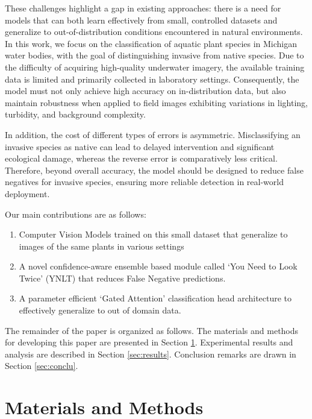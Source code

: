 \documentclass[final,3p,times,twocolumn]{elsarticle}
\begin{document}
These challenges highlight a gap in existing approaches: there is a need for models that can both learn effectively from small, controlled datasets and generalize to out-of-distribution conditions encountered in natural environments. In this work, we focus on the classification of aquatic plant species in Michigan water bodies, with the goal of distinguishing invasive from native species. Due to the difficulty of acquiring high-quality underwater imagery, the available training data is limited and primarily collected in laboratory settings. Consequently, the model must not only achieve high accuracy on in-distribution data, but also maintain robustness when applied to field images exhibiting variations in lighting, turbidity, and background complexity.

In addition, the cost of different types of errors is asymmetric. Misclassifying an invasive species as native can lead to delayed intervention and significant ecological damage, whereas the reverse error is comparatively less critical. Therefore, beyond overall accuracy, the model should be designed to reduce false negatives for invasive species, ensuring more reliable detection in real-world deployment.




Our main contributions are as follows:

\begin{enumerate}
\item Computer Vision Models trained on this small dataset that generalize to images of the same plants in various settings
\item A novel confidence-aware ensemble based module called `You Need to Look Twice' (YNLT) that reduces False Negative predictions.
\item A parameter efficient `Gated Attention' classification head architecture to effectively generalize to out of domain data. 
\end{enumerate}

The remainder of the paper is organized as follows. The materials and methods for developing this paper are presented in Section \ref{sec:materials_methods}.  Experimental results and analysis are described in Section \ref{sec:results}. Conclusion remarks are drawn in Section \ref{sec:conclu}.


\section{Materials and Methods}
\label{sec:materials_methods}
\end{document}
